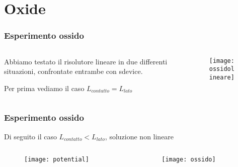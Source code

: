 \section{Oxide}
\begin{frame}
\tableofcontents[currentsection]
\end{frame}

\begin{frame}
\frametitle{Esperimento ossido}
\begin{columns}
\begin{column}{0.5 \textwidth}
Abbiamo testato il risolutore lineare in due differenti situazioni, confrontate entrambe con sdevice. 

Per prima vediamo il caso $L_{contatto} = L_{lato}$
\end{column}
\begin{column}{0.5 \textwidth}
\begin{center}
\begin{figure}[!h]
          {\texttt{[image: ossidolineare]}}
          \end{figure}
\end{center}
\end{column}

\end{columns}


\end{frame}

\begin{frame}
\frametitle{Esperimento ossido}
Di seguito il caso $L_{contatto} < L_{lato}$, soluzione non lineare

\begin{columns}

\begin{column}{0.3 \textwidth}
\begin{center}
\begin{figure}[!h]
          {\texttt{[image: potential]}}
          \end{figure}
\end{center}
\end{column}

\begin{column}{0.3 \textwidth}
\begin{center}
\begin{figure}[!h]
          {\texttt{[image: ossido]}}
          \end{figure}
\end{center}
\end{column}

\end{columns}

\end{frame}

